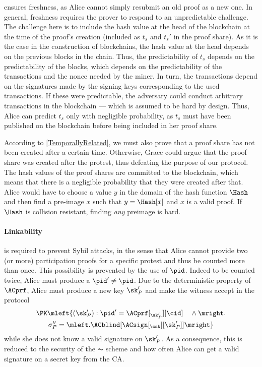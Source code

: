  ensures freshness, as Alice cannot simply resubmit an old proof as a new one.
In general, freshness requires the prover to respond to an unpredictable challenge.
The challenge here is to include the hash value at the head of the blockchain at the time of the proof's creation (included as \(t_s\) and \(t_s'\) in the proof share).
As it is the case in the construction of blockchains, the hash value at the head depends on the previous blocks in the chain.
Thus, the predictability of \(t_s\) depends on the predictability of the blocks, which depends on the predictability of the transactions and the nonce needed by the miner.
In turn, the transactions depend on the signatures made by the signing keys corresponding to the used transactions.
If these were predictable, the adversary could conduct arbitrary transactions in the blockchain --- which is assumed to be hard by design.
Thus, Alice can predict \(t_s\) only with negligible probability, as \(t_s\) must have been published on the blockchain before being included in her proof share.

According to \cref{TemporallyRelated}, we must also prove that a proof share has not been created after a certain time.
Otherwise, Grace could argue that the proof share was created after the protest, thus defeating the purpose of our protocol.
The hash values of the proof shares are committed to the blockchain, which means that there is a negligible probability that they were created after that.
Alice would have to choose a value \(y\) in the domain of the hash function \(\Hash\) and then find a pre-image \(x\) such that \(y = \Hash[x]\) and \(x\) is a valid proof.
If \(\Hash\) is collision resistant, finding \emph{any} preimage is hard.

\paragraph{Linkability}
\label{analysis-linkability}

 is required to prevent Sybil attacks, in the sense
that Alice cannot provide two (or more) participation proofs for a
specific protest and thus be counted more than once.
This possibility is prevented by the use of \(\pid\).
Indeed to be counted twice, Alice must produce a \(\pid'\neq \pid\).
Due to the deterministic property of \(\ACprf\), Alice must produce a new key \(\sk_P'\) and make the witness accept in the protocol
\begin{multline*}
\PK\mleft\{ (\sk_P') : \pid' = \ACprf[_{\sk_P'}][\cid] \quad \land \mright. \\
    \sigma_P'' = \mleft. \ACblind[\ACsign[_{\ssk}][\sk_P']] \mright\}
\end{multline*}
while she does not know a valid signature on \(\sk_P'\).
As a consequence, this is reduced to the security of the \(\AC\) scheme and how often Alice can get a valid signature on a secret key from the \ac{CA}.

